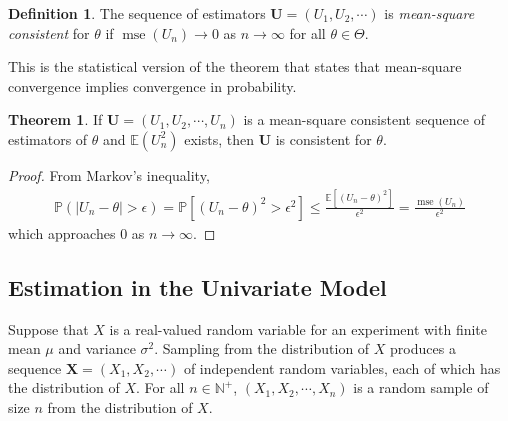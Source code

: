 \documentclass[a4paper,12pt]{article}
\theoremstyle{definition}
\newtheorem{theorem}{Theorem}[section]
\theoremstyle{definition}
\theoremstyle{definition}
\newtheorem{definition}{Definition}[section]
\newcommand{\bs}{\boldsymbol}
\newcommand{\mse}{\operatorname{mse}}
\begin{document}
    \begin{definition}
        The sequence of estimators $\bs{U} = (U_1, U_2, \cdots)$ is \textit{mean-square consistent} for $\theta$ if $\mse(U_n) \to 0$ as $n \to \infty$ for all $\theta \in \Theta$.
    \end{definition}
    This is the statistical version of the theorem that states that mean-square convergence implies convergence in probability.
    \begin{theorem}
        If $\bs{U} = (U_1, U_2, \cdots, U_n)$ is a mean-square consistent sequence of estimators of $\theta$ and $\mathbb{E}(U_n^2)$ exists, then $\bs{U}$ is consistent for $\theta$.
        \begin{proof}
            From Markov's inequality,
            \begin{align*}
                \mathbb{P}(|U_n - \theta| > \epsilon) = \mathbb{P} \left[ (U_n - \theta)^2 > \epsilon^2 \right] \leq \frac{\mathbb{E} \left[ (U_n - \theta)^2 \right]}{\epsilon^2} = \frac{\mse(U_n)}{\epsilon^2}
            \end{align*}
            which approaches $0$ as $n \to \infty$.
        \end{proof}
    \end{theorem}

    \subsection*{Estimation in the Univariate Model}
    Suppose that $X$ is a real-valued random variable for an experiment with finite mean $\mu$ and variance $\sigma^2$. Sampling from the distribution of $X$ produces a sequence $\bs{X} = (X_1, X_2, \cdots)$ of independent random variables, each of which has the distribution of $X$. For all $n \in \mathbb{N}^+$, $(X_1, X_2, \cdots, X_n)$ is a random sample of size $n$ from the distribution of $X$. \par
\end{document}
